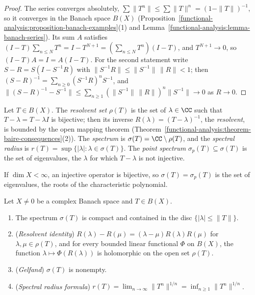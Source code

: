 \begin{proof}
The series converges absolutely, $\sum\|T^n\| \leq \sum\|T\|^n = (1 - \|T\|)^{-1}$, so it converges in the Banach space $B(X)$ (Proposition~\ref{functional-analysis:proposition-banach-examples}(1) and
Lemma~\ref{functional-analysis:lemma-banach-series}). Its sum $A$ satisfies $(I - T)\sum_{n \leq N}T^n = I - T^{N+1} = (\sum_{n \leq N}T^n)(I - T)$, and $T^{N+1} \to 0$, so $(I - T)A = I = A(I - T)$. For the
second statement write $S - R = S(I - S^{-1}R)$ with $\|S^{-1}R\| \leq \|S^{-1}\|\,\|R\| < 1$; then $(S - R)^{-1} = \sum_{n \geq 0}(S^{-1}R)^nS^{-1}$, and
$\|(S - R)^{-1} - S^{-1}\| \leq \sum_{n \geq 1}(\|S^{-1}\|\,\|R\|)^n\|S^{-1}\| \to 0$ as $R \to 0$.
\end{proof}

\begin{definition}\label{functional-analysis:definition-spectrum}
Let $T \in B(X)$. The \emph{resolvent set} $\rho(T)$ is the set of $\lambda \in \CC$ such that $T - \lambda = T - \lambda I$ is bijective; then its inverse $R(\lambda) = (T - \lambda)^{-1}$, the \emph{resolvent}, is bounded
by the open mapping theorem (Theorem~\ref{functional-analysis:theorem-baire-consequences}(2)). The \emph{spectrum} is $\sigma(T) = \CC \setminus \rho(T)$, and the \emph{spectral radius} is
$r(T) = \sup\{|\lambda| : \lambda \in \sigma(T)\}$. The \emph{point spectrum} $\sigma_p(T) \subseteq \sigma(T)$ is the set of eigenvalues, the $\lambda$ for which $T - \lambda$ is not injective.
\end{definition}

If $\dim X < \infty$, an injective operator is bijective, so $\sigma(T) = \sigma_p(T)$ is the set of eigenvalues, the roots of the characteristic polynomial.

\begin{theorem}\label{functional-analysis:theorem-spectrum}
Let $X \neq 0$ be a complex Banach space and $T \in B(X)$.
\begin{enumerate}
\item The spectrum $\sigma(T)$ is compact and contained in the disc $\{|\lambda| \leq \|T\|\}$.
\item (\emph{Resolvent identity}) $R(\lambda) - R(\mu) = (\lambda - \mu)R(\lambda)R(\mu)$ for $\lambda, \mu \in \rho(T)$, and for every bounded linear functional $\Phi$ on $B(X)$, the function $\lambda \mapsto \Phi(R(\lambda))$ is
holomorphic on the open set $\rho(T)$.
\item (\emph{Gelfand}) $\sigma(T)$ is nonempty.
\item (\emph{Spectral radius formula}) $r(T) = \lim_{n \to \infty}\|T^n\|^{1/n} = \inf_{n \geq 1}\|T^n\|^{1/n}$.
\end{enumerate}
\end{theorem}

